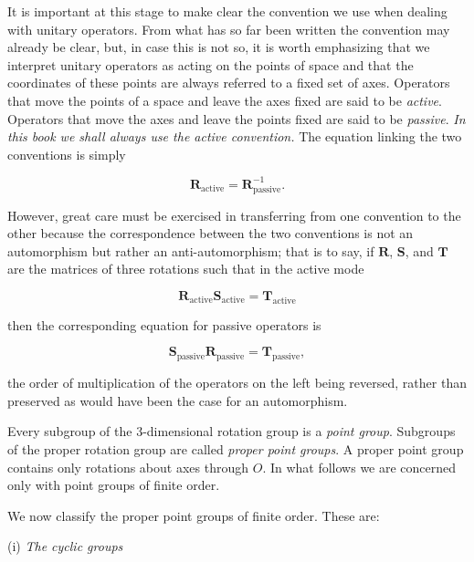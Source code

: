 \documentclass[11pt,a4paper,twoside,openright]{book}
\begin{document}
It is important at this stage to make clear the convention we use when dealing with unitary operators. From what has so far been written the convention may already be clear, but, in case this is not so, it is worth emphasizing that we interpret unitary operators as acting on the points of space and that the coordinates of these points are always referred to a fixed set of axes. Operators that move the points of a space and leave the axes fixed are said to be \textit{active}. Operators that move the axes and leave the points fixed are said to be \textit{passive}. \textit{In this book we shall always use the active convention.} The equation linking the two conventions is simply

\begin{equation*}
\mathbf{R}_{\mathrm{active}} = \mathbf{R}_{\mathrm{passive}}^{-1}. \tag{1.4.3}
\end{equation*}

However, great care must be exercised in transferring from one convention to the other because the correspondence between the two conventions is not an automorphism but rather an anti-automorphism; that is to say, if $\mathbf{R}$, $\mathbf{S}$, and $\mathbf{T}$ are the matrices of three rotations such that in the active mode

\begin{equation*}
\mathbf{R}_{\mathrm{active}}\mathbf{S}_{\mathrm{active}} = \mathbf{T}_{\mathrm{active}} \tag{1.4.4}
\end{equation*}

then the corresponding equation for passive operators is

\begin{equation*}
\mathbf{S}_{\mathrm{passive}}\mathbf{R}_{\mathrm{passive}} = \mathbf{T}_{\mathrm{passive}}, \tag{1.4.5}
\end{equation*}

the order of multiplication of the operators on the left being reversed, rather than preserved as would have been the case for an automorphism.

Every subgroup of the 3-dimensional rotation group is a \textit{point group}. Subgroups of the proper rotation group are called \textit{proper point groups}. A proper point group contains only rotations about axes through $O$. In what follows we are concerned only with point groups of finite order.

We now classify the proper point groups of finite order. These are:

(i) \textit{The cyclic groups}
\end{document}
